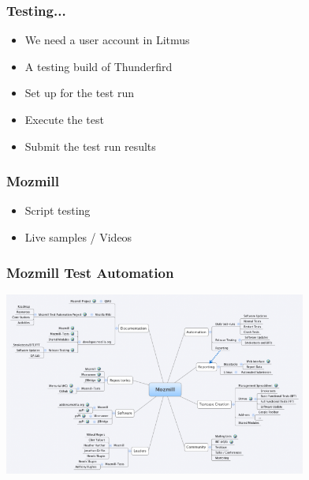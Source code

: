 \documentclass{beamer}
\begin{document}

\begin{frame}
\frametitle{Testing...}
 \begin{itemize}
   \item We need a user account in Litmus
   \item A testing build of Thunderfird
   \item Set up for the test run
   \item Execute the test
   \item Submit the test run results
 \end{itemize}
\end{frame}



\begin{frame}
\frametitle{Mozmill}
 \begin{itemize}
  \item Script testing
  \item Live samples / Videos
 \end{itemize}
\end{frame}



\begin{frame}
\frametitle{Mozmill Test Automation}
\begin{center}
 \includegraphics[height=6cm]{figs/Mozmill_Test_Automation_Map.png}
\begin{figure}
\end{figure}
\end{center}
\end{frame}


\end{document}
